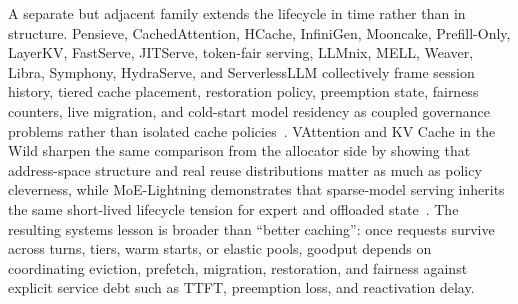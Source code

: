 \documentclass[acmsmall,screen,review]{acmart}
\begin{document}
A separate but adjacent family extends the lifecycle in time rather than in structure. Pensieve, CachedAttention, HCache, InfiniGen, Mooncake, Prefill-Only, LayerKV, FastServe, JITServe, token-fair serving, LLMnix, MELL, Weaver, Libra, Symphony, HydraServe, and ServerlessLLM collectively frame session history, tiered cache placement, restoration policy, preemption state, fairness counters, live migration, and cold-start model residency as coupled governance problems rather than isolated cache policies~\cite{yu2025pensieve,gao2025cachedattention,gao2025hcache,infinigen2024,qin2025mooncake,du2025prefillonly,xiong2024layerkv,wu2026fastserve,zhang2026jitserve,sheng2024fairnessserving,sun2024llumnix,liu2025mell,gao2025weaver,ruan2026libra,agarwal2026symphony,lou2026hydraserve,fu2024serverlessllm}. VAttention and KV Cache in the Wild sharpen the same comparison from the allocator side by showing that address-space structure and real reuse distributions matter as much as policy cleverness, while MoE-Lightning demonstrates that sparse-model serving inherits the same short-lived lifecycle tension for expert and offloaded state~\cite{prabhu2025vattention,wang2025kvcachewild,cao2025moelightning}. The resulting systems lesson is broader than ``better caching'': once requests survive across turns, tiers, warm starts, or elastic pools, goodput depends on coordinating eviction, prefetch, migration, restoration, and fairness against explicit service debt such as TTFT, preemption loss, and reactivation delay.
\end{document}

